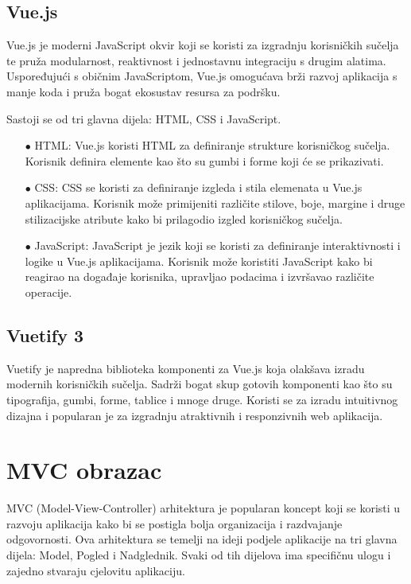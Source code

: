 \documentclass[times, utf8, zavrsni]{fer}
\begin{document}
\subsection{Vue.js}
Vue.js je moderni JavaScript okvir koji se koristi za izgradnju korisničkih sučelja te
pruža modularnost, reaktivnost i jednostavnu integraciju s drugim alatima. 
Uspoređujući s običnim JavaScriptom, Vue.js omogućava brži razvoj aplikacija s manje koda i pruža bogat ekosustav resursa za podršku.

Sastoji se od tri glavna dijela: HTML, CSS i JavaScript.

\begin{itemize}

    \item[$\bullet$]HTML: Vue.js koristi HTML za definiranje strukture korisničkog sučelja. 
    Korisnik definira elemente kao što su gumbi i forme koji će se prikazivati.

    \item[$\bullet$]CSS: CSS se koristi za definiranje izgleda i stila elemenata u Vue.js aplikacijama. 
    Korisnik može primijeniti različite stilove, boje, margine i druge stilizacijske atribute kako bi prilagodio izgled korisničkog sučelja.

    \item[$\bullet$]JavaScript: JavaScript je jezik koji se koristi za definiranje interaktivnosti i logike u Vue.js aplikacijama. 
    Korisnik može koristiti JavaScript kako bi reagirao na događaje korisnika, upravljao podacima i izvršavao različite operacije.

\end{itemize}

\subsection{Vuetify 3}
Vuetify je napredna biblioteka komponenti za Vue.js koja olakšava izradu modernih korisničkih sučelja. 
Sadrži bogat skup gotovih komponenti kao što su tipografija, gumbi, forme, tablice i mnoge druge.
Koristi se za izradu intuitivnog dizajna i popularan je za izgradnju atraktivnih i responzivnih web aplikacija.


\section{MVC obrazac}
MVC (Model-View-Controller) arhitektura je popularan koncept koji se koristi u razvoju aplikacija kako bi se postigla bolja organizacija i razdvajanje odgovornosti. 
Ova arhitektura se temelji na ideji podjele aplikacije na tri glavna dijela: Model, Pogled i Nadglednik. 
Svaki od tih dijelova ima specifičnu ulogu i zajedno stvaraju cjelovitu aplikaciju.
\end{document}
